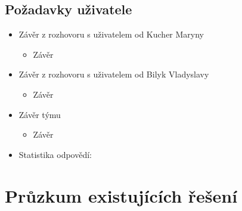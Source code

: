 \documentclass[a4paper,12pt]{article}
\begin{document}
\subsection*{Požadavky uživatele}
\begin{itemize}
    \item Závěr z rozhovoru s uživatelem od Kucher Maryny
    \begin{itemize}
        \item Závěr
    \end{itemize}
    \item Závěr z rozhovoru s uživatelem od Bilyk Vladyslavy
    \begin{itemize}
        \item Závěr
    \end{itemize}
    \item Závěr týmu
    \begin{itemize}
        \item Závěr
    \end{itemize}
    \item Statistika odpovědí:
\end{itemize}

\section*{Průzkum existujících řešení}
\end{document}
